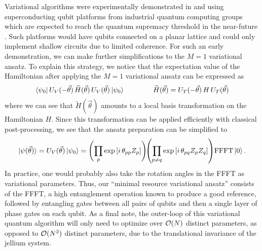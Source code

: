 \documentclass[superscriptaddress,aps,pra,nofootinbib,notitlepage,10pt,longbibliography]{revtex4-1}
\def\bra#1{\mathinner{\langle{#1}|}}
\def\ket#1{\mathinner{|{#1}\rangle}}
\begin{document}
Variational algorithms were experimentally demonstrated in \cite{Kandala2017} and \cite{OMalley2016} using superconducting qubit platforms from industrial quantum computing groups which are expected to reach the quantum supremacy threshold in the near-future \cite{Boixo2016}. Such platforms would have qubits connected on a planar lattice and could only implement shallow circuits due to limited coherence. For such an early demonstration, we can make further simplifications to the $M = 1$ variational ansatz. To explain this strategy, we notice that  the expectation value of the Hamiltonian after applying the $M = 1$ variational ansatz can be expressed as
\begin{equation}
\bra{\psi_0} U_V(-\vec \theta) \, \widetilde H (\vec \theta) \, U_V (\vec \theta) \ket{\psi_0}
\quad \quad \quad \quad
\widetilde H(\vec \theta) = U_T(-\vec \theta) \, H \, U_T(\vec \theta)
\end{equation}
where we can see that $\widetilde H(\vec \theta)$ amounts to a local basis transformation on the Hamiltonian $H$. Since this transformation can be applied efficiently with classical post-processing, we see that the ansatz preparation can be simplified to
\begin{equation}
\ket{\psi(\vec \theta)} =  U_V (\vec \theta) \ket{\psi_0} = \left(\prod_{p} \exp\left[i\, \theta_{pp} Z_p \right]\right) \! \! \left( \prod_{p \neq q} \exp\left[i \, \theta_{pq} Z_p Z_q\right] \right) \! \textrm{FFFT} \ket{0}.
\label{eq:minimal_vqe}
\end{equation}
In practice, one would probably also take the rotation angles in the FFFT as variational parameters. Thus, our ``minimal resource variational ansatz'' consists of the FFFT, a high entanglement operation known to produce a good reference, followed by entangling gates between all pairs of qubits and then a single layer of phase gates on each qubit. As a final note, the outer-loop of this variational quantum algorithm will only need to optimize over ${\cal O}(N)$ distinct parameters, as opposed to ${\cal O}(N^2)$ distinct parameters, due to the translational invariance of the jellium system.
\end{document}
